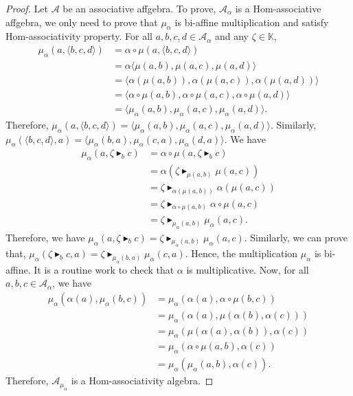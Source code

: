 \documentclass[14pt]{article}
\theoremstyle{Definition}
\theoremstyle{remark}
\begin{document}
\begin{proof}
Let $\mathcal{A}$ be an associative affgebra. To prove, $\mathcal{A}_{\alpha}$ is a Hom-associative affgebra, we only need to prove that $\mu_{\alpha}$ is bi-affine multiplication and satisfy Hom-associativity property.
For all $a,b,c,d\in \mathcal{A_{\alpha}}$ and any $\zeta\in \mathbb{K}$,
\begin{align*}
\mu_{\alpha}(a,\langle b,c,d\rangle)&=\alpha\circ\mu (a,\langle b,c,d\rangle)\\
&=\alpha\langle \mu(a,b),\mu(a,c),\mu(a,d)\rangle\\
&=\langle \alpha (\mu(a,b)),\alpha(\mu(a,c)),\alpha(\mu(a,d))\rangle\\
&=\langle \alpha \circ\mu(a,b),\alpha\circ\mu(a,c),\alpha\circ\mu(a,d)\rangle\\
&=\langle \mu_{\alpha}(a,b),\mu_{\alpha}(a,c),\mu_{\alpha}(a,d)\rangle.
\end{align*}
Therefore, $\mu_{\alpha}(a,\langle b,c,d\rangle)=\langle \mu_{\alpha}(a,b),\mu_{\alpha}(a,c),\mu_{\alpha}(a,d)\rangle$. Similarly, $\mu_{\alpha}(\langle b,c,d\rangle,a)=\langle \mu_{\alpha}(b,a),\mu_{\alpha}(c,a),\mu_{\alpha}(d,a)\rangle.$
We have 
\begin{align*}
\mu_{\alpha}(a,\zeta\blacktriangleright_{b}c)&=\alpha\circ\mu(a,\zeta\blacktriangleright_{b}c)\\
&=\alpha(\zeta\blacktriangleright_{\mu(a,b)}\mu(a,c))\\
&=\zeta\blacktriangleright_{\alpha(\mu(a,b))}\alpha(\mu(a,c))\\
&=\zeta\blacktriangleright_{\alpha\circ\mu(a,b)}\alpha\circ\mu(a,c)\\
&=\zeta\blacktriangleright_{\mu_{\alpha}(a,b)}\mu_{\alpha}(a,c).
\end{align*}
Therefore, we have $\mu_{\alpha}(a,\zeta\blacktriangleright_{b}c)=\zeta\blacktriangleright_{\mu_{\alpha}(a,b)}\mu_{\alpha}(a,c)$. Similarly, we can prove that, $\mu_{\alpha}(\zeta\blacktriangleright_{b}c,a)=\zeta\blacktriangleright_{\mu_{\alpha}(b,a)}\mu_{\alpha}(c,a)$. Hence, the multiplication $\mu_{\alpha}$ is bi-affine. It is a routine work to check that $\alpha$ is multiplicative. Now, for all $a,b,c\in \mathcal{A_{\alpha}}$, we have
\begin{align*}
\mu_{\alpha}(\alpha(a),\mu_{\alpha}(b,c))&=\mu_{\alpha}(\alpha(a),\alpha\circ\mu(b,c))\\
&=\mu_{\alpha}(\alpha(a),\mu(\alpha(b),\alpha(c)))\\
&=\mu_{\alpha}(\mu(\alpha(a),\alpha(b)),\alpha(c))\\
&=\mu_{\alpha}(\alpha\circ\mu(a,b),\alpha(c))\\
&=\mu_{\alpha}(\mu_{\alpha}(a,b),\alpha(c)).
\end{align*}
Therefore, $\mathcal{A}_{\mu_{\alpha}}$ is a Hom-associativity algebra.
\end{proof}
\end{document}
